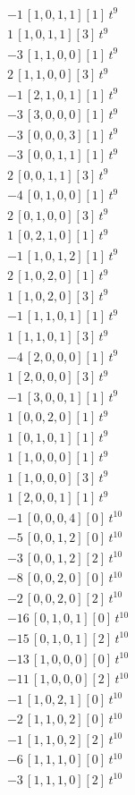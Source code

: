 \begin{align*}
-1\,[1,0,1,1] [1]\,t^{9} \\
1\,[1,0,1,1] [3]\,t^{9} \\
-3\,[1,1,0,0] [1]\,t^{9} \\
2\,[1,1,0,0] [3]\,t^{9} \\
-1\,[2,1,0,1] [1]\,t^{9} \\
-3\,[3,0,0,0] [1]\,t^{9} \\
-3\,[0,0,0,3] [1]\,t^{9} \\
-3\,[0,0,1,1] [1]\,t^{9} \\
2\,[0,0,1,1] [3]\,t^{9} \\
-4\,[0,1,0,0] [1]\,t^{9} \\
2\,[0,1,0,0] [3]\,t^{9} \\
1\,[0,2,1,0] [1]\,t^{9} \\
-1\,[1,0,1,2] [1]\,t^{9} \\
2\,[1,0,2,0] [1]\,t^{9} \\
1\,[1,0,2,0] [3]\,t^{9} \\
-1\,[1,1,0,1] [1]\,t^{9} \\
1\,[1,1,0,1] [3]\,t^{9} \\
-4\,[2,0,0,0] [1]\,t^{9} \\
1\,[2,0,0,0] [3]\,t^{9} \\
-1\,[3,0,0,1] [1]\,t^{9} \\
1\,[0,0,2,0] [1]\,t^{9} \\
1\,[0,1,0,1] [1]\,t^{9} \\
1\,[1,0,0,0] [1]\,t^{9} \\
1\,[1,0,0,0] [3]\,t^{9} \\
1\,[2,0,0,1] [1]\,t^{9} \\
-1\,[0,0,0,4] [0]\,t^{10} \\
-5\,[0,0,1,2] [0]\,t^{10} \\
-3\,[0,0,1,2] [2]\,t^{10} \\
-8\,[0,0,2,0] [0]\,t^{10} \\
-2\,[0,0,2,0] [2]\,t^{10} \\
-16\,[0,1,0,1] [0]\,t^{10} \\
-15\,[0,1,0,1] [2]\,t^{10} \\
-13\,[1,0,0,0] [0]\,t^{10} \\
-11\,[1,0,0,0] [2]\,t^{10} \\
-1\,[1,0,2,1] [0]\,t^{10} \\
-2\,[1,1,0,2] [0]\,t^{10} \\
-1\,[1,1,0,2] [2]\,t^{10} \\
-6\,[1,1,1,0] [0]\,t^{10} \\
-3\,[1,1,1,0] [2]\,t^{10} \\

\end{align*}
